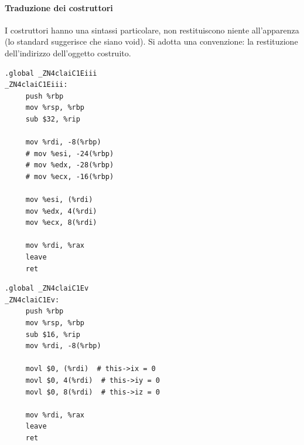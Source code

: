 \documentclass[11pt]{report}
\theoremstyle{definition}
\begin{document}
\paragraph{Traduzione dei costruttori}
I costruttori hanno una sintassi particolare, non restituiscono niente all'apparenza (lo standard suggerisce che siano void). Si adotta una convenzione: la restituzione dell'indirizzo dell'oggetto costruito.
\begin{multicols}{2}
\begin{verbatim}
.global _ZN4claiC1Eiii
_ZN4claiC1Eiii: 
     push %rbp
     mov %rsp, %rbp
     sub $32, %rip

     mov %rdi, -8(%rbp)
     # mov %esi, -24(%rbp)
     # mov %edx, -28(%rbp)
     # mov %ecx, -16(%rbp)

     mov %esi, (%rdi)
     mov %edx, 4(%rdi)
     mov %ecx, 8(%rdi)

     mov %rdi, %rax
     leave
     ret
\end{verbatim}
\columnbreak
\begin{verbatim} 
.global _ZN4claiC1Ev
_ZN4claiC1Ev:
     push %rbp
     mov %rsp, %rbp
     sub $16, %rip
     mov %rdi, -8(%rbp)
     
     movl $0, (%rdi)  # this->ix = 0
     movl $0, 4(%rdi)  # this->iy = 0
     movl $0, 8(%rdi)  # this->iz = 0
      
     mov %rdi, %rax
     leave
     ret
\end{verbatim}
\end{multicols}
\end{document}
